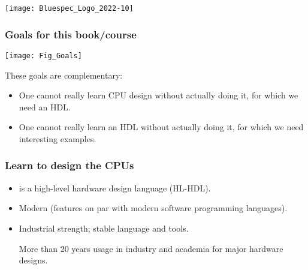 



\date{L1: Introduction}





\begin{frame}
 \titlepage

 \begin{center}
  \texttt{[image: Bluespec\_Logo\_2022-10]}
 \end{center}
\end{frame}



\begin{frame}
\frametitle{Goals for this book/course}

\footnotesize

\begin{center}
 \texttt{[image: Fig\_Goals]}
\end{center}

These goals are complementary:
\begin{itemize}

 \item One cannot really learn CPU design without actually doing it,
       for which we need an HDL.

 \item One cannot really learn an HDL without actually doing it, for
       which we need interesting examples.

\end{itemize}

\end{frame}


\begin{frame}
\frametitle{Learn {\BSV} to design the CPUs}

\footnotesize

\begin{itemize}

 \item {\BSV} is a high-level hardware design language (HL-HDL).

 \item Modern (features on par with modern software programming languages).

 \item Industrial strength; stable language and tools.

       More than 20 years usage in industry and academia for major hardware designs.
\end{itemize}

\end{frame}

